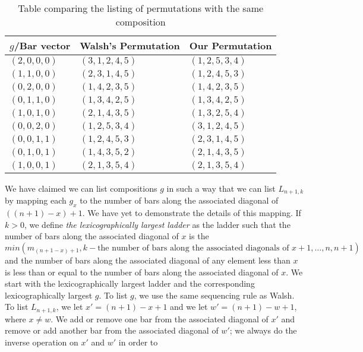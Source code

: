  \begin{table}[h]
  \centering
  \caption{Table comparing the listing of permutations with the same composition}
  \begin{tabular}{|p{4cm}|p{4cm}|p{4cm}|}
    
    \hline 
    $g$/Bar vector & Walsh's Permutation & Our Permutation \\ 
    \hline 
    \hline 
    $(2,0,0,0)$ & $(3,1,2,4,5)$ & $(1,2,5,3,4)$ \\ 
    \hline 
    $(1,1,0,0)$ & $(2,3,1,4,5)$ & $(1,2,4,5,3)$ \\ 
    \hline 
    $(0,2,0,0)$ & $(1,4,2,3,5)$ & $(1,4,2,3,5)$ \\ 
    \hline 
    $(0,1,1,0)$ & $(1,3,4,2,5)$ & $(1,3,4,2,5)$ \\ 
    \hline 
    $(1,0,1,0)$ & $(2,1,4,3,5)$ & $(1,3,2,5,4)$ \\ 
    \hline 
    $(0,0,2,0)$ & $(1,2,5,3,4)$ & $(3,1,2,4,5)$\\ 
    \hline 
    $(0,0,1,1)$ & $(1,2,4,5,3)$ & $(2,3,1,4,5)$ \\ 
    \hline 
    $(0,1,0,1)$ & $(1,4,3,5,2)$ & $(2,1,4,3,5)$ \\ 
    \hline 
    $(1,0,0,1)$ & $(2,1,3,5,4)$ & $(2,1,3,5,4)$ \\ 
    \hline 

  \end{tabular}
  \label{Table:diffPermsSameComp}
 \end{table}
We have claimed we can list compositions $g$ in such a way that we can list $L_{n+1,k}$ by mapping each $g_{x}$ to the number of bars along the associated diagonal 
of $((n+1)-x)+1$. We have yet to demonstrate the details of this mapping. If $k>0$, we define \emph{the lexicographically largest ladder} as the 
ladder such that the number of bars along the associated diagonal of $x$ is the $min(m_{(n+1-x)+1}, k-\text{the number of bars along the associated diagonals of } x+1,\dots,n,n+1)$ 
and the number of bars along the associated diagonal of any element less than $x$ is less than or equal to the number of bars along the 
associated diagonal of $x$.
 We start with the lexicographically largest ladder and the corresponding lexicographically largest $g$. To list $g$, we use the same 
 sequencing rule as Walsh. To list $L_{n+1, k}$, we let $x'=(n+1)-x+1$ and we let $w'=(n+1)-w+1$, where $x \neq w$. We add or remove one bar from the associated diagonal of $x'$ and remove or add another bar 
 from the associated diagonal of $w'$; we always do the inverse operation on $x'$ and $w'$ in order to 
